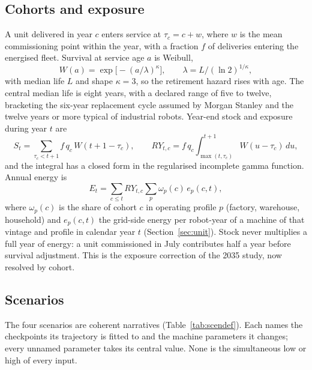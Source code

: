 \documentclass[11pt]{article}
\newcommand{\tabref}[1]{Table~\ref{#1}}
\newcommand{\secref}[1]{Section~\ref{#1}}
\begin{document}
\subsection{Cohorts and exposure}\label{sec:cohorts}
A unit delivered in year $c$ enters service at $\tau_c = c + w$, where $w$ is the mean commissioning point within the year, with a fraction $f$ of deliveries entering the energised fleet. Survival at service age $a$ is Weibull,
\begin{equation}\label{eq:weibull}
W(a) = \exp\!\big[-(a/\lambda)^{\kappa}\big],\qquad \lambda = L/(\ln 2)^{1/\kappa},
\end{equation}
with median life $L$ and shape $\kappa=3$, so the retirement hazard rises with age. The central median life is eight years, with a declared range of five to twelve, bracketing the six-year replacement cycle assumed by Morgan Stanley and the twelve years or more typical of industrial robots. Year-end stock and exposure during year $t$ are
\begin{equation}\label{eq:exposure}
S_t = \sum_{\tau_c<t+1} f\,q_c\,W(t+1-\tau_c),\qquad
RY_{t,c} = f\,q_c\int_{\max(t,\tau_c)}^{t+1} W(u-\tau_c)\,du,
\end{equation}
and the integral has a closed form in the regularised incomplete gamma function. Annual energy is
\begin{equation}\label{eq:energy}
E_t = \sum_{c\le t} RY_{t,c} \sum_{p} \omega_p(c)\, e_p(c,t),
\end{equation}
where $\omega_p(c)$ is the share of cohort $c$ in operating profile $p$ (factory, warehouse, household) and $e_p(c,t)$ the grid-side energy per robot-year of a machine of that vintage and profile in calendar year $t$ (\secref{sec:unit}). Stock never multiplies a full year of energy: a unit commissioned in July contributes half a year before survival adjustment. This is the exposure correction of the 2035 study, now resolved by cohort.

\subsection{Scenarios}\label{sec:scenarios}
The four scenarios are coherent narratives (\tabref{tab:scendef}). Each names the checkpoints its trajectory is fitted to and the machine parameters it changes; every unnamed parameter takes its central value. None is the simultaneous low or high of every input.
\end{document}

